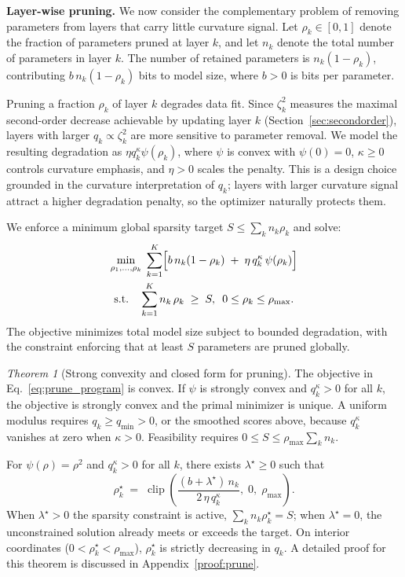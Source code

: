 \documentclass[accepted]{uai2026}%
\theoremstyle{remark}%
\newtheorem{theorem}{Theorem}
\begin{document}
\textbf{Layer-wise pruning.}
We now consider the complementary problem of removing parameters from
layers that carry little curvature signal.
Let $\rho_k \in [0,1]$ denote the fraction of parameters pruned at
layer $k$, and let $n_k$ denote the total number of parameters in layer $k$.
The number of retained parameters is $n_k(1-\rho_k)$,
contributing $b\,n_k(1-\rho_k)$ bits to model size,
where $b > 0$ is bits per parameter.

Pruning a fraction $\rho_k$ of layer $k$ degrades data fit.
Since $\zeta_k^{2}$ measures the maximal second-order decrease
achievable by updating layer $k$ (Section~\ref{sec:secondorder}),
layers with larger $q_k \propto \zeta_k^{2}$ are more sensitive to
parameter removal.
We model the resulting degradation as $\eta q_k^{\kappa}\psi(\rho_k)$,
where $\psi$ is convex with $\psi(0)=0$,
$\kappa \ge 0$ controls curvature emphasis, and $\eta > 0$ scales the penalty.
This is a design choice grounded in the curvature interpretation of $q_k$;
layers with larger curvature signal attract a higher degradation penalty,
so the optimizer naturally protects them. 

We enforce a minimum global sparsity target $S \le \sum_k n_k \rho_k$
and solve:
\begin{multline}
  \label{eq:prune_program}
  \min_{\rho_1, \ldots, \rho_k}
  \;\sum_{k=1}^{K}
  \Bigl[
    b\,n_k(1-\rho_k)
    \;+\;
    \eta\,q_k^{\kappa}\,\psi(\rho_k)
  \Bigr]
  \\
  \text{s.t.}
  \quad
  \sum_{k=1}^{K} n_k\,\rho_k \;\ge\; S, \,\,\, 0 \le \rho_k \le \rho_{\max}.
\end{multline}
The objective minimizes total model size subject to bounded degradation,
with the constraint enforcing that at least $S$ parameters are pruned globally.

\begin{theorem}[Strong convexity and closed form for pruning]
\label{thm:prune}
The objective in Eq.~\eqref{eq:prune_program} is convex.
If $\psi$ is strongly convex and $q_k^\kappa>0$ for all
$k$, the objective is strongly convex and the primal minimizer is unique. A
uniform modulus requires $q_k\ge q_{\min}>0$, or the smoothed scores above,
because $q_k^\kappa$ vanishes at zero when $\kappa>0$. Feasibility requires
$0\le S\le \rho_{\max}\sum_k n_k$.

For $\psi(\rho) = \rho^{2}$ and $q_k^{\kappa} > 0$ for all $k$,
there exists $\lambda^{\star} \ge 0$ such that
\begin{equation}
  \label{eq:prune_closed}
  \boxed{
  \rho_k^{\star}
  \;=\;
  \operatorname{clip}\!\left(
    \frac{(b + \lambda^{\star})\,n_k}{2\,\eta\,q_k^{\kappa}},
    \;0,\;\rho_{\max}
  \right).
  }
\end{equation}
When $\lambda^{\star} > 0$ the sparsity constraint is active,
$\sum_k n_k\rho_k^{\star} = S$;
when $\lambda^{\star} = 0$, the unconstrained solution already
meets or exceeds the target.
On interior coordinates ($0 < \rho_k^{\star} < \rho_{\max}$),
$\rho_k^{\star}$ is strictly decreasing in $q_k$.  A detailed proof for this theorem is discussed in Appendix~\ref{proof:prune}.
\end{theorem}
\end{document}
